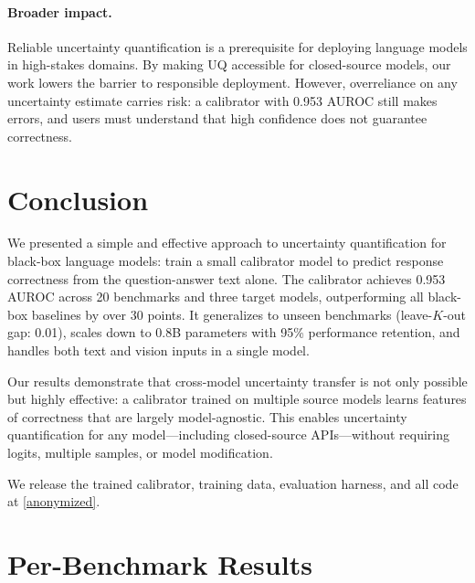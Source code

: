 \documentclass{colm2026}
\begin{document}
\paragraph{Broader impact.}
Reliable uncertainty quantification is a prerequisite for deploying language models in high-stakes domains. By making UQ accessible for closed-source models, our work lowers the barrier to responsible deployment. However, overreliance on any uncertainty estimate carries risk: a calibrator with 0.953 AUROC still makes errors, and users must understand that high confidence does not guarantee correctness.

\section{Conclusion}
\label{sec:conclusion}

We presented a simple and effective approach to uncertainty quantification for black-box language models: train a small calibrator model to predict response correctness from the question-answer text alone. The calibrator achieves 0.953 AUROC across 20 benchmarks and three target models, outperforming all black-box baselines by over 30 points. It generalizes to unseen benchmarks (leave-$K$-out gap: 0.01), scales down to 0.8B parameters with 95\% performance retention, and handles both text and vision inputs in a single model.

Our results demonstrate that cross-model uncertainty transfer is not only possible but highly effective: a calibrator trained on multiple source models learns features of correctness that are largely model-agnostic. This enables uncertainty quantification for any model---including closed-source APIs---without requiring logits, multiple samples, or model modification.

We release the trained calibrator, training data, evaluation harness, and all code at \url{[anonymized]}.




\appendix

\section{Per-Benchmark Results}
\label{app:per_benchmark}
\end{document}
